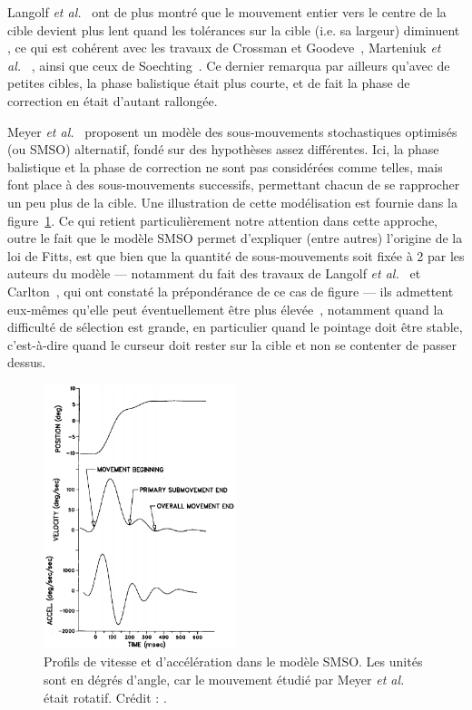 	Langolf \emph{et al.}~\cite{langolf1976investigation} ont de plus montré que \og le mouvement entier vers le centre de la cible devient plus lent quand les tolérances sur la cible (i.e. sa largeur) diminuent \fg{}, ce qui est cohérent avec les travaux de Crossman et Goodeve~\cite{crossman1983feedback}, Marteniuk \emph{et al.}~ \cite{marteniuk1987constraints}, ainsi que ceux de Soechting~\cite{soechting1984effect}. Ce dernier remarqua par ailleurs qu'avec de petites cibles, la phase balistique était plus courte, et de fait la phase de correction en était d'autant rallongée.
	
	Meyer \emph{et al.}~\cite{meyer1988optimality} proposent un modèle \og des sous-mouvements stochastiques optimisés \fg{} (ou SMSO) alternatif, fondé sur des hypothèses assez différentes. Ici, la phase balistique et la phase de correction ne sont pas considérées comme telles, mais font place à des sous-mouvements successifs, permettant chacun de se rapprocher un peu plus de la cible. Une illustration de cette modélisation est fournie dans la figure~\ref{fig:meyer}. Ce qui retient particulièrement notre attention dans cette approche, outre le fait que le modèle SMSO permet d'expliquer (entre autres) l'origine de la loi de Fitts, est que bien que la quantité de sous-mouvements soit fixée à 2 par les auteurs du modèle --- notamment du fait des travaux de Langolf \emph{et al.}~\cite{langolf1976investigation} et Carlton~\cite{carlton1979control}, qui ont constaté la prépondérance de ce cas de figure --- ils admettent eux-mêmes qu'elle peut éventuellement être plus élevée~\cite{crossman1963feedback, crossman1983feedback}, notamment quand la difficulté de sélection est grande, en particulier quand le pointage doit être stable, c'est-à-dire quand le curseur doit rester sur la cible et non se contenter de passer dessus.
	
	\begin{figure}
		\centering
		\includegraphics[width=0.50\textwidth]{figures/ch2/meyer}
		\caption[Profils de vitesse et d'accélération dans le modèle SMSO]{Profils de vitesse et d'accélération dans le modèle SMSO. Les unités sont en dégrés d'angle, car le mouvement étudié par Meyer \emph{et al.} était rotatif. Crédit : \cite{meyer1988optimality}.}
		\label{fig:meyer}
	\end{figure}
	
